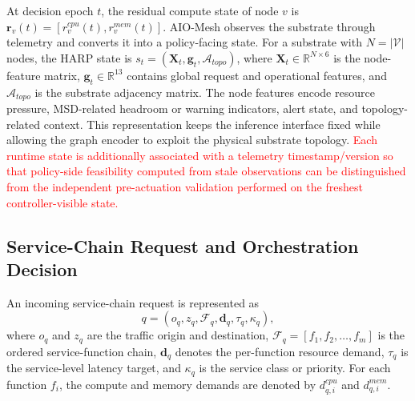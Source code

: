 \documentclass[final,5p]{elsarticle}
\newcommand{\rev}[1]{\textcolor{red}{#1}}
\begin{document}
At decision epoch \(t\), the residual compute state of node \(v\) is $\mathbf{r}_v(t)=\left[r_v^{cpu}(t),r_v^{mem}(t)\right]$.
AIO-Mesh observes the substrate through telemetry and converts it into a policy-facing state. For a substrate with \(N=|\mathcal{V}|\) nodes, the HARP state is $s_t = \left(\mathbf{X}_t,\mathbf{g}_t,\mathcal{A}_{topo}\right)$, where \(\mathbf{X}_t\in\mathbb{R}^{N\times 6}\) is the node-feature matrix, \(\mathbf{g}_t\in\mathbb{R}^{13}\) contains global request and operational features, and \(\mathcal{A}_{topo}\) is the substrate adjacency matrix. The node features encode resource pressure, MSD-related headroom or warning indicators, alert state, and topology-related context. This representation keeps the inference interface fixed while allowing the graph encoder to exploit the physical substrate topology. \rev{Each runtime state is additionally associated with a telemetry timestamp/version so that policy-side feasibility computed from stale observations can be distinguished from the independent pre-actuation validation performed on the freshest controller-visible state.}

\subsection{Service-Chain Request and Orchestration Decision}
\label{subsec:sfc_model}

An incoming service-chain request is represented as
\begin{equation}
    q=(o_q,z_q,\mathcal{F}_q,\mathbf{d}_q,\tau_q,\kappa_q),
\end{equation}
where \(o_q\) and \(z_q\) are the traffic origin and destination, \(\mathcal{F}_q=[f_1,f_2,\ldots,f_m]\) is the ordered service-function chain, \(\mathbf{d}_q\) denotes the per-function resource demand, \(\tau_q\) is the service-level latency target, and \(\kappa_q\) is the service class or priority. For each function \(f_i\), the compute and memory demands are denoted by \(d_{q,i}^{cpu}\) and \(d_{q,i}^{mem}\).
\end{document}
